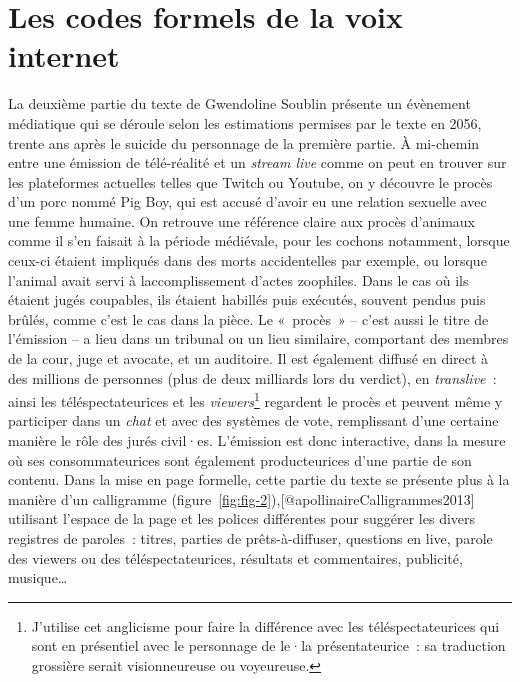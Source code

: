 \documentclass[
]{article}
\begin{document}
\section{Les codes formels de la voix internet}\label{les-codes-formels-de-la-voix-internet}

La deuxième partie du texte de Gwendoline Soublin présente un évènement médiatique qui se déroule selon les estimations permises par le texte en 2056, trente ans après le suicide du personnage de la première partie. À mi-chemin entre une émission de télé-réalité et un \emph{stream live} comme on peut en trouver sur les plateformes actuelles telles que Twitch ou Youtube, on y découvre le procès d'un porc nommé Pig Boy, qui est accusé d'avoir eu une relation sexuelle avec une femme humaine. On retrouve une référence claire aux procès d'animaux comme il s'en faisait à la période médiévale, pour les cochons notamment, lorsque ceux-ci étaient impliqués dans des morts accidentelles par exemple, ou lorsque l'animal avait servi à l\textquotesingle accomplissement d'actes zoophiles. Dans le cas où ils étaient jugés coupables, ils étaient habillés puis exécutés, souvent pendus puis brûlés, comme c'est le cas dans la pièce. Le «~procès~» -- c'est aussi le titre de l'émission -- a lieu dans un tribunal ou un lieu similaire, comportant des membres de la cour, juge et avocate, et un auditoire. Il est également diffusé en direct à des millions de personnes (plus de deux milliards lors du verdict), en \emph{translive~}: ainsi les téléspectateurices et les \emph{viewers}\footnote{J'utilise cet anglicisme pour faire la différence avec les téléspectateurices qui sont en présentiel avec le personnage de le·la présentateurice~: sa traduction grossière serait visionneureuse ou voyeureuse.} regardent le procès et peuvent même y participer dans un \emph{chat} et avec des systèmes de vote, remplissant d'une certaine manière le rôle des jurés civil·es. L'émission est donc interactive, dans la mesure où ses consommateurices sont également producteurices d'une partie de son contenu. Dans la mise en page formelle, cette partie du texte se présente plus à la manière d'un calligramme (figure~\ref{fig:fig-2}),{[}@apollinaireCalligrammes2013{]} utilisant l'espace de la page et les polices différentes pour suggérer les divers registres de paroles~: titres, parties de prêts-à-diffuser, questions en live, parole des viewers ou des téléspectateurices, résultats et commentaires, publicité, musique\ldots{}
\end{document}
